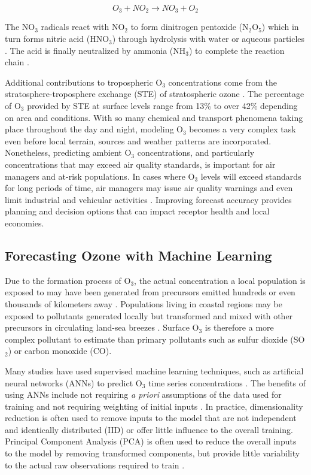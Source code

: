 \begin{equation}
\label{eq:nitrateformation}
O_{3} + NO_{2}\rightarrow NO_{3}+O_{2} 
\end{equation}

The NO$_{3}$ radicals react with NO$_{2}$ to form dinitrogen pentoxide (N$_{2}$O$_{5}$) which in turn forms nitric acid (HNO$_{3}$) through hydrolysis with water or aqueous particles \citep{Song2011}. The acid is finally neutralized by ammonia (NH$_{3}$) to complete the reaction chain \citep{Brown2012}.

Additional contributions to tropospheric O$_{3}$ concentrations come from the stratosphere-troposphere exchange (STE) of stratospheric ozone \citep{Tarasick2008}. The percentage of O$_{3}$ provided by STE at surface levels range from 13\% \citep{Cooper2006} to over 42\% \citep{Lelieveld2000} depending on area and conditions. With so many chemical and transport phenomena taking place throughout the day and night, modeling O$_{3}$ becomes a very complex task even before local terrain, sources and weather patterns are incorporated. Nonetheless, predicting ambient O$_{3}$ concentrations, and particularly concentrations that may exceed air quality standards, is important for air managers and at-risk populations.  In cases where O$_{3}$ levels will exceed standards for long periods of time, air managers may issue air quality warnings and even limit industrial and vehicular activities \citep{Kuhlbusch2014, Welch2005}. Improving forecast accuracy provides planning and decision options that can impact receptor health and local economies.

\subsection{Forecasting Ozone with Machine Learning}

Due to the formation process of O$_{3}$, the actual concentration a local population is exposed to may have been generated from precursors emitted hundreds or even thousands of kilometers away \citep{Glavas2011}. Populations living in coastal regions may be exposed to pollutants generated locally but transformed and mixed with other precursors in circulating land-sea breezes \citep{Freeman2017a}. Surface O$_{3}$ is therefore a more complex pollutant to estimate than primary pollutants such as sulfur dioxide (SO$_{2}$) or carbon monoxide (CO).

Many studies have used supervised machine learning techniques, such as artificial neural networks (ANNs) to predict O$_{3}$ time series concentrations \citep{Comrie1997, Dorling2003, Ettouney2009a, Kurt2008, Biancofiore2017}. The benefits of using ANNs include not requiring \textit{a priori} assumptions of the data used for training and not requiring weighting of initial inputs \citep{Gardner1998}. In practice, dimensionality reduction is often used to remove inputs to the model that are not independent and identically distributed (IID) or offer little influence to the overall training. Principal Component Analysis (PCA) is often used to reduce the overall inputs to the model by removing transformed components, but provide little variability to the actual raw observations required to train \citep{Singh2013, Wang2015a}.

